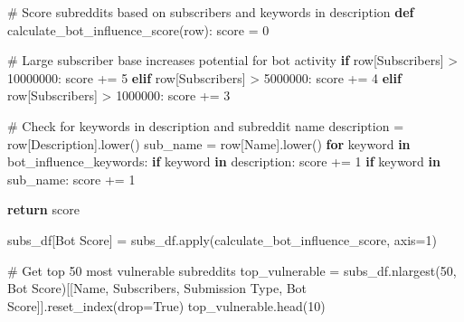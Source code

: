 \documentclass[
  12pt,
  letterpaper,
  DIV=11,
  numbers=noendperiod]{scrartcl}
\newenvironment{Shaded}{\begin{snugshade}}{\end{snugshade}}
\newcommand{\BuiltInTok}[1]{\textcolor[rgb]{0.00,0.23,0.31}{#1}}
\newcommand{\CommentTok}[1]{\textcolor[rgb]{0.37,0.37,0.37}{#1}}
\newcommand{\ControlFlowTok}[1]{\textcolor[rgb]{0.00,0.23,0.31}{\textbf{#1}}}
\newcommand{\DecValTok}[1]{\textcolor[rgb]{0.68,0.00,0.00}{#1}}
\newcommand{\KeywordTok}[1]{\textcolor[rgb]{0.00,0.23,0.31}{\textbf{#1}}}
\newcommand{\NormalTok}[1]{\textcolor[rgb]{0.00,0.23,0.31}{#1}}
\newcommand{\OperatorTok}[1]{\textcolor[rgb]{0.37,0.37,0.37}{#1}}
\newcommand{\StringTok}[1]{\textcolor[rgb]{0.13,0.47,0.30}{#1}}
\newcommand{\VariableTok}[1]{\textcolor[rgb]{0.07,0.07,0.07}{#1}}
\begin{document}
\begin{Shaded}
\begin{Highlighting}[]
\CommentTok{\# Score subreddits based on subscribers and keywords in description}
\KeywordTok{def}\NormalTok{ calculate\_bot\_influence\_score(row):}
\NormalTok{    score }\OperatorTok{=} \DecValTok{0}
    
    \CommentTok{\# Large subscriber base increases potential for bot activity}
    \ControlFlowTok{if}\NormalTok{ row[}\StringTok{\textquotesingle{}Subscribers\textquotesingle{}}\NormalTok{] }\OperatorTok{\textgreater{}} \DecValTok{10000000}\NormalTok{:}
\NormalTok{        score }\OperatorTok{+=} \DecValTok{5}
    \ControlFlowTok{elif}\NormalTok{ row[}\StringTok{\textquotesingle{}Subscribers\textquotesingle{}}\NormalTok{] }\OperatorTok{\textgreater{}} \DecValTok{5000000}\NormalTok{:}
\NormalTok{        score }\OperatorTok{+=} \DecValTok{4}
    \ControlFlowTok{elif}\NormalTok{ row[}\StringTok{\textquotesingle{}Subscribers\textquotesingle{}}\NormalTok{] }\OperatorTok{\textgreater{}} \DecValTok{1000000}\NormalTok{:}
\NormalTok{        score }\OperatorTok{+=} \DecValTok{3}
        
    \CommentTok{\# Check for keywords in description and subreddit name}
\NormalTok{    description }\OperatorTok{=}\NormalTok{ row[}\StringTok{\textquotesingle{}Description\textquotesingle{}}\NormalTok{].lower()}
\NormalTok{    sub\_name }\OperatorTok{=}\NormalTok{ row[}\StringTok{\textquotesingle{}Name\textquotesingle{}}\NormalTok{].lower()}
    \ControlFlowTok{for}\NormalTok{ keyword }\KeywordTok{in}\NormalTok{ bot\_influence\_keywords:}
        \ControlFlowTok{if}\NormalTok{ keyword }\KeywordTok{in}\NormalTok{ description:}
\NormalTok{            score }\OperatorTok{+=} \DecValTok{1}
        \ControlFlowTok{if}\NormalTok{ keyword }\KeywordTok{in}\NormalTok{ sub\_name:}
\NormalTok{            score }\OperatorTok{+=} \DecValTok{1}
            
    \ControlFlowTok{return}\NormalTok{ score}

\NormalTok{subs\_df[}\StringTok{\textquotesingle{}Bot Score\textquotesingle{}}\NormalTok{] }\OperatorTok{=}\NormalTok{ subs\_df.}\BuiltInTok{apply}\NormalTok{(calculate\_bot\_influence\_score, axis}\OperatorTok{=}\DecValTok{1}\NormalTok{)}

\CommentTok{\# Get top 50 most vulnerable subreddits}
\NormalTok{top\_vulnerable }\OperatorTok{=}\NormalTok{ subs\_df.nlargest(}\DecValTok{50}\NormalTok{, }\StringTok{\textquotesingle{}Bot Score\textquotesingle{}}\NormalTok{)[[}\StringTok{\textquotesingle{}Name\textquotesingle{}}\NormalTok{, }\StringTok{\textquotesingle{}Subscribers\textquotesingle{}}\NormalTok{, }\StringTok{\textquotesingle{}Submission Type\textquotesingle{}}\NormalTok{, }\StringTok{\textquotesingle{}Bot Score\textquotesingle{}}\NormalTok{]].reset\_index(drop}\OperatorTok{=}\VariableTok{True}\NormalTok{)}
\NormalTok{top\_vulnerable.head(}\DecValTok{10}\NormalTok{)}
\end{Highlighting}
\end{Shaded}
\end{document}
